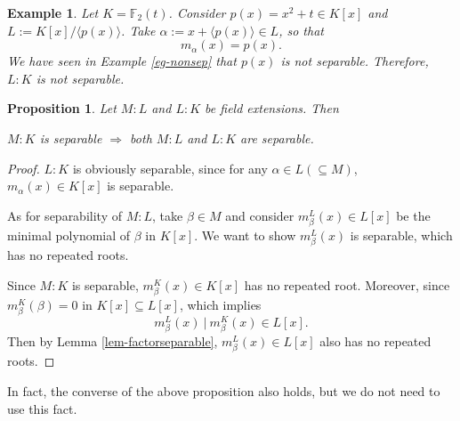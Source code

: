 \documentclass[11pt]{book}
\newtheorem{example}[theorem]{Example}
\newtheorem{proposition}[theorem]{Proposition}
\begin{document}
\begin{example} Let $K = \mathbb{F}_2(t)$. Consider $p(x) = x^2 + t \in K[x]$ and $L := K[x]/\langle p(x) \rangle$. 
Take $\alpha := x + \langle p(x) \rangle \in L$, so that 
$$m_{\alpha}(x) = p(x).$$
We have seen in Example \ref{eg-nonsep} that $p(x)$ is not separable. Therefore, $L:K$ is not separable. 
\end{example}






\begin{proposition}
Let $M:L$ and $L:K$ be field extensions. Then 
\begin{center}
$M:K$ is separable \quad $\Rightarrow$ \quad  both $M:L$ and $L:K$ are separable.    
\end{center}
\end{proposition} 

\begin{proof}
\(L:K\) is obviously separable, since for any \(\alpha \in L(\subseteq M)\), \(m_\alpha(x) \in K[x]\) is separable.

As for separability of \(M:L\), take \(\beta \in M\) and consider \(m_\beta^L(x) \in L[x]\) be the minimal polynomial of \(\beta\) in \(K[x]\). We want to show \(m_\beta^L(x)\) is separable, which has no repeated roots.

Since \(M:K\) is separable, \(m_\beta^K(x) \in K[x]\) has no repeated root. Moreover, since \(m_\beta^K(\beta)  = 0\) in \(K[x] \subseteq L[x]\), which implies \[m_\beta^L(x )\ |\ m_\beta^K(x) \in L[x].\] 
Then by Lemma \ref{lem-factorseparable}, \(m_\beta^L(x) \in L[x]\) also has no repeated roots.
\end{proof}
In fact, the converse of the above proposition also holds, but we do not need to use this fact.
    
\end{document}
